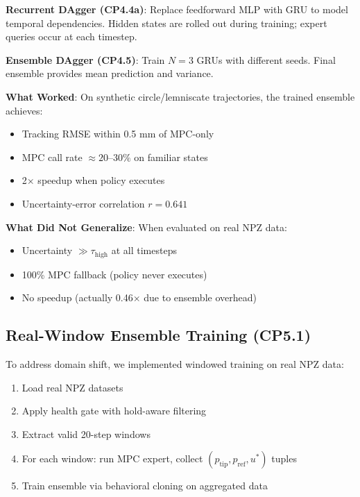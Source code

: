 \documentclass[conference]{IEEEtran}
\begin{document}
\textbf{Recurrent DAgger (CP4.4a)}: Replace feedforward MLP with GRU to model temporal dependencies. Hidden states are rolled out during training; expert queries occur at each timestep.

\textbf{Ensemble DAgger (CP4.5)}: Train $N=3$ GRUs with different seeds. Final ensemble provides mean prediction and variance.

\textbf{What Worked}: On synthetic circle/lemniscate trajectories, the trained ensemble achieves:
\begin{itemize}
\item Tracking RMSE within 0.5 mm of MPC-only
\item MPC call rate $\approx 20$--$30\%$ on familiar states
\item 2$\times$ speedup when policy executes
\item Uncertainty-error correlation $r = 0.641$
\end{itemize}

\textbf{What Did Not Generalize}: When evaluated on real NPZ data:
\begin{itemize}
\item Uncertainty $\gg \tau_{\text{high}}$ at all timesteps
\item 100\% MPC fallback (policy never executes)
\item No speedup (actually 0.46$\times$ due to ensemble overhead)
\end{itemize}

\subsection{Real-Window Ensemble Training (CP5.1)}

To address domain shift, we implemented windowed training on real NPZ data:

\begin{enumerate}
\item Load real NPZ datasets
\item Apply health gate with hold-aware filtering
\item Extract valid 20-step windows
\item For each window: run MPC expert, collect $(p_{\text{tip}}, p_{\text{ref}}, u^*)$ tuples
\item Train ensemble via behavioral cloning on aggregated data
\end{enumerate}
\end{document}

